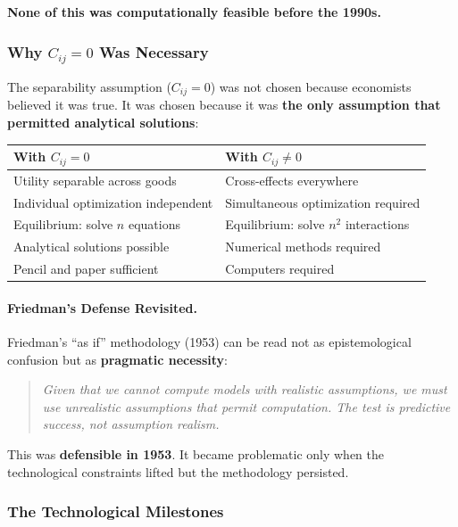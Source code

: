 \textbf{None of this was computationally feasible before the 1990s.}

\subsubsection{Why $C_{ij} = 0$ Was Necessary}

The separability assumption ($C_{ij} = 0$) was not chosen because economists
believed it was true. It was chosen because it was \textbf{the only assumption
that permitted analytical solutions}:

\begin{center}
\renewcommand{\arraystretch}{1.3}
\begin{tabular}{@{}p{5.5cm}p{5.5cm}@{}}
\toprule
\textbf{With $C_{ij} = 0$} & \textbf{With $C_{ij} \neq 0$} \\
\midrule
Utility separable across goods & Cross-effects everywhere \\
Individual optimization independent & Simultaneous optimization required \\
Equilibrium: solve $n$ equations & Equilibrium: solve $n^2$ interactions \\
Analytical solutions possible & Numerical methods required \\
Pencil and paper sufficient & Computers required \\
\bottomrule
\end{tabular}
\end{center}

\paragraph{Friedman's Defense Revisited.}
Friedman's ``as if'' methodology (1953) can be read not as epistemological
confusion but as \textbf{pragmatic necessity}:

\begin{quote}
\textit{Given that we cannot compute models with realistic assumptions,
we must use unrealistic assumptions that permit computation.
The test is predictive success, not assumption realism.}
\end{quote}

This was \textbf{defensible in 1953}. It became problematic only when
the technological constraints lifted but the methodology persisted.

\subsubsection{The Technological Milestones}


